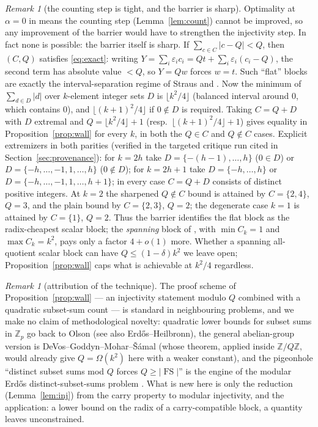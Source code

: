 \documentclass[11pt]{article}
\theoremstyle{definition}
\theoremstyle{remark}
\newtheorem{remark}[lemma]{Remark}
\newcommand{\Z}{\mathbb{Z}}
\newcommand{\FS}{\operatorname{FS}}
\begin{document}
\begin{remark}[the counting step is tight, and the barrier is
sharp]\label{rem:wall-sharp}
Optimality at $\alpha=0$ in \cite[Remark~10]{BP22} means the counting
step (Lemma~\ref{lem:count}) cannot be improved, so any improvement of
the barrier would have to strengthen the injectivity step. In fact none
is possible: the barrier itself is sharp. If
$\sum_{c\in C}|c-Q|<Q$, then $(C,Q)$ satisfies \eqref{eq:exact}: writing
$Y=\sum_i\varepsilon_ic_i=Qt+\sum_i\varepsilon_i(c_i-Q)$, the second
term has absolute value $<Q$, so $Y=Qw$ forces $w=t$. Such ``flat''
blocks are exactly the interval-separation regime of Straus
\cite{Straus66} and \cite{ENS91}. Now the minimum of $\sum_{d\in D}|d|$ over $k$-element
integer sets $D$ is $\lfloor k^2/4\rfloor$ (balanced interval around $0$,
which contains $0$), and $\lfloor(k+1)^2/4\rfloor$ if $0\notin D$ is
required. Taking $C=Q+D$ with $D$ extremal and
$Q=\lfloor k^2/4\rfloor+1$ (resp.\ $\lfloor(k+1)^2/4\rfloor+1$) gives
equality in Proposition~\ref{prop:wall} for every $k$, in both the
$Q\in C$ and $Q\notin C$ cases. Explicit extremizers in both parities
(verified in the targeted critique run cited in
Section~\ref{sec:provenance}): for $k=2h$ take
$D=\{-(h-1),\dots,h\}$ ($0\in D$) or $D=\{-h,\dots,-1,1,\dots,h\}$
($0\notin D$); for $k=2h+1$ take $D=\{-h,\dots,h\}$ or
$D=\{-h,\dots,-1,1,\dots,h+1\}$; in every case $C=Q+D$ consists of
distinct positive integers. At $k=2$ the sharpened $Q\notin C$ bound is
attained by $C=\{2,4\}$, $Q=3$, and the plain bound by $C=\{2,3\}$,
$Q=2$; the degenerate case $k=1$ is attained by $C=\{1\}$, $Q=2$.
Thus the barrier identifies the flat block as the radix-cheapest scalar
block; the \emph{spanning} block of \cite{Mazur26}, with
$\min C_k=1$ and $\max C_k=k^2$, pays only a factor $4+o(1)$ more.
Whether a spanning all-quotient scalar block can have
$Q\le(1-\delta)k^2$ we leave open; Proposition~\ref{prop:wall} caps what
is achievable at $k^2/4$ regardless.
\end{remark}

\begin{remark}[attribution of the technique]\label{rem:technique}
The proof scheme of Proposition~\ref{prop:wall} --- an injectivity
statement modulo $Q$ combined with a quadratic subset-sum count --- is
standard in neighbouring problems, and we make no claim of methodological
novelty: quadratic lower bounds for subset sums in $\Z_p$ go back to
Olson \cite{Olson68} (see also Erd\H{o}s--Heilbronn), the general
abelian-group version is DeVos--Goddyn--Mohar--\v{S}\'amal \cite{DGMS07}
(whose theorem, applied inside $\Z/Q\Z$, would already give
$Q=\Omega(k^2)$ here with a weaker constant), and the
pigeonhole ``distinct subset sums mod $Q$ forces $Q\ge|\FS|$'' is the
engine of the modular Erd\H{o}s distinct-subset-sums problem
\cite{CGKL23}. What is new here is only the reduction
(Lemma~\ref{lem:inj}) from the carry property to modular injectivity,
and the application: a lower bound on the radix of a carry-compatible
block, a quantity \cite[Remark~4]{Mazur26} leaves unconstrained.
\end{remark}
\end{document}
